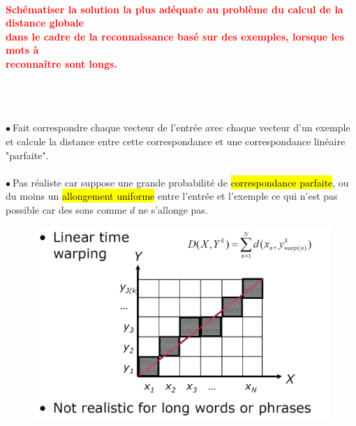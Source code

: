 \documentclass[letterpaper, 12pt]{article}
\newcommand{\red}[1]{
	\textcolor{red}{#1}
}
\newcommand{\point}{$\bullet\ $}
\begin{document}
    	\paragraph{\red{Schématiser la solution la plus adéquate au problème du calcul de la distance globale 
    	~\\ \hspace*{0.035cm} dans le cadre de la reconnaissance basé sur des exemples, lorsque les mots à 
    	~\\ \hspace*{0.035cm} reconnaître sont longs.}}~\\~\\
    		\begin{minipage}{0.4\textwidth}
				\point Fait correspondre chaque vecteur de l'entrée avec chaque vecteur d'un exemple et
					calcule la distance entre cette correspondance et une correspondance linéaire "parfaite".\\~\\
				\point Pas réaliste car suppose une grande probabilité de \hl{correspondance parfaite}, ou du moins
					un \hl{allongement uniforme} entre l'entrée et l'exemple ce qui n'est pas possible car des sons
					comme $d$ ne s'allonge pas.
			\end{minipage}\hfill
			\begin{minipage}{0.55\textwidth}
				\begin{figure}[H]
				 	\centering
				 	\includegraphics[scale=0.25]{Images/linear_time_wrapping}
				 \end{figure}\noindent 
			\end{minipage}~\\
\end{document}
